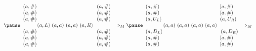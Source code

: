 \documentclass[xcolor=dvipsnames]{beamer}
\begin{document}
{{\scriptsize
\[
\pause
\begin{array}{l}
(a, \#)\ \ \ \ \ \ \ \ \ \ \ \ \ \ \ \ \ \ \ \ \ \ \ \ \ \ \ \ \ \ \ \ \ \ (a, \#) \\
(a, \#)\ \ \ \ \ \ \ \ \ \ \ \ \ \ \ \ \ \ \ \ \ \ \ \ \ \ \ \ \ \ \ \ \ \ (a, \#) \\
(a, \#)\ \ \ \ \ \ \ \ \ \ \ \ \ \ \ \ \ \ \ \ \ \ \ \ \ \ \ \ \ \ \ \ \ \ (a, \#) \\
\ \ \ \ \ \ \ \ (a, L)\ (a, a)\ (a, a)\ (a, R)\ \  \\
(a, \#)\ \ \ \ \ \ \ \ \ \ \ \ \ \ \ \ \ \ \ \ \ \ \ \ \ \ \ \ \ \ \ \ \ \ (a, \#) \\
(a, \#)\ \ \ \ \ \ \ \ \ \ \ \ \ \ \ \ \ \ \ \ \ \ \ \ \ \ \ \ \ \ \ \ \ \ (a, \#) \\
(a, \#)\ \ \ \ \ \ \ \ \ \ \ \ \ \ \ \ \ \ \ \ \ \ \ \ \ \ \ \ \ \ \ \ \ \ (a, \#) \\
\end{array}
\Rightarrow_M
\pause
\begin{array}{l}
(a, \#)\ \ \ \ \ \ \ \ \ \ \ \ \ \ \ \ \ \ \ \ \ \ \ \ \ \ \ \ \ \ \ \ \ \ (a, \#) \\
(a, \#)\ \ \ \ \ \ \ \ \ \ \ \ \ \ \ \ \ \ \ \ \ \ \ \ \ \ \ \ \ \ \ \ \ \ (a, \#) \\
(a, U_L)\ \ \ \ \ \ \ \ \ \ \ \ \ \ \ \ \ \ \ \ \ \ \ \ \ \ \ \ \ \ \ \ \ (a, U_R) \\
\ \ \ \ \ \ \ \ \ \ (a, a)\ (a, a)\ (a, a)\ (a, a)\ \  \\
(a, D_L)\ \ \ \ \ \ \ \ \ \ \ \ \ \ \ \ \ \ \ \ \ \ \ \ \ \ \ \ \ \ \ \ \ (a, D_R) \\
(a, \#)\ \ \ \ \ \ \ \ \ \ \ \ \ \ \ \ \ \ \ \ \ \ \ \ \ \ \ \ \ \ \ \ \ \ (a, \#) \\
(a, \#)\ \ \ \ \ \ \ \ \ \ \ \ \ \ \ \ \ \ \ \ \ \ \ \ \ \ \ \ \ \ \ \ \ \ (a, \#) \\
\end{array}
\Rightarrow_M
\]
}

}
\end{document}
